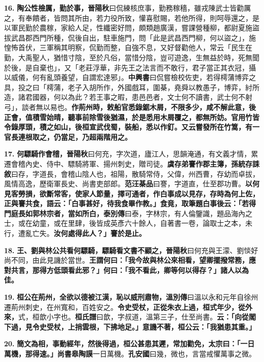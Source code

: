\textbf{16.} \textbf{陶公性檢厲，勤於事，}{\footnotesize \textbf{晉陽秋}曰侃練核庶事，勤務稼穡，雖戎陳武士皆勸厲之，有奉饋者，皆問其所由，若力役所致，懽喜慰賜，若他所得，則呵辱還之，是以軍民勤於農稼，家給人足，性纖密好問，頗類趙廣漢，嘗課營種柳，都尉夏施盜拔武昌郡西門所種，侃後自出，駐車施門，問「此是武昌西門柳，何以盜之」，施惶怖首伏，三軍稱其明察，侃勤而整，自強不息，又好督勸他人，常云「民生在勤，大禹聖人，猶惜寸陰，至於凡俗，當惜分陰，豈可遊逸，生無益於時，死無聞於後，是自棄也」，又「老莊浮華，非先王之法言而不敢行，君子當正其衣冠，攝以威儀，何有亂頭養望，自謂宏達邪」。\textbf{中興書}曰侃嘗檢校佐吏，若得樗蒲博弈之具，投之曰「樗蒲，老子入胡所作，外國戲耳，圍棊，堯舜以教愚子，博弈，紂所造，諸君國器，何以為此？若王事之暇，患邑邑者，文士何不讀書，武士何不射弓」，談者無以易也。}\textbf{作荊州時，敕船官悉錄鋸木屑，不限多少，咸不解此意，後正會，值積雪始晴，聽事前除雪後猶濕，於是悉用木屑覆之，都無所妨。官用竹皆令錄厚頭，積之如山，後桓宣武伐蜀，裝船，悉以作釘。又云嘗發所在竹篙，有一官長連根取之，仍當足，乃超兩階用之。}

\textbf{17.} \textbf{何驃騎作會稽，}{\footnotesize \textbf{晉陽秋}曰何充，字次道，廬江人，思韻淹通，有文義才情，累遷會稽內史、侍中、驃騎將軍、揚州刺史，贈司徒。}\textbf{虞存弟謇作郡主簿，}{\footnotesize \textbf{孫統存誄敘}曰存，字道長，會稽山陰人也，祖陽，散騎常侍，父偉，州西曹，存幼而卓拔，風情高逸，歷衛軍長史、尚書吏部郎。\textbf{范汪棊品}曰謇，字道直，仕至郡功曹。}\textbf{以何見客勞損，欲斷常客，使家人節量，擇可通者，作白事成以見存，存時為何上佐，正與謇共食，語云：「白事甚好，待我食畢作教。」食竟，取筆題白事後云：「若得門庭長如郭林宗者，當如所白，}{\footnotesize \textbf{泰別傳}曰泰，字林宗，有人倫鑒識，題品海內之士，或在幼童，或在里肆，後皆成英彥六十餘人，自著書一卷，論取士之本，未行，遭亂亡失。}\textbf{汝何處得此人？」謇於是止。}

\textbf{18.} \textbf{王、劉與林公共看何驃騎，驃騎看文書不顧之，}{\footnotesize \textbf{晉陽秋}曰何充與王濛、劉惔好尚不同，由此見譏於當世。}\textbf{王謂何曰：「我今故與林公來相看，望卿擺撥常務，應對共言，那得方低頭看此邪？」何曰：「我不看此，卿等何以得存？」諸人以為佳。}

\textbf{19.} \textbf{桓公在荊州，全欲以德被江漢，恥以威刑肅物，}{\footnotesize \textbf{溫別傳}曰溫以永和元年自徐州遷荊州刺史，在州寬和，百姓安之。}\textbf{令史受杖，正從朱衣上過，桓式年少，從外來，}{\footnotesize 式，桓歆小字也。\textbf{桓氏譜}曰歆，字叔道，溫第三子，仕至尚書。}\textbf{云：「向從閣下過，見令史受杖，上捎雲根，下拂地足。」意譏不著，桓公云：「我猶患其重。」}

\textbf{20.} \textbf{簡文為相，事動經年，然後得過，桓公甚患其遲，常加勸免，太宗曰：「一日萬機，那得速。」}{\footnotesize \textbf{尚書皋陶謨}一日萬機。\textbf{孔安國}曰幾，微也，言當戒懼萬事之微。}

